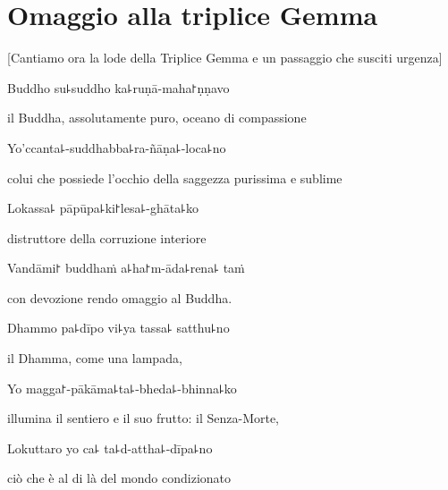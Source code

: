 \clearpage

\chapter{Omaggio alla triplice Gemma}

\begin{leader}
\end{leader}

\begin{english}
  [Cantiamo ora la lode della Triplice Gemma e un passaggio che susciti urgenza]
\end{english}

Buddho su꜕suddho ka꜕ruṇā-maha꜓ṇṇavo

\begin{english}
il Buddha, assolutamente puro, oceano di compassione
\end{english}

Yo'ccanta꜕-suddhabba꜕ra-ñāṇa꜕-loca꜕no

\begin{english}
colui che possiede l'occhio della saggezza purissima e sublime
\end{english}

Lokassa꜕ pāpūpa꜕ki꜓lesa꜕-ghāta꜕ko

\begin{english}
distruttore della corruzione interiore
\end{english}

Vandāmi꜓ buddhaṁ a꜕ha꜓m-āda꜕rena꜕ taṁ

\begin{english}
con devozione rendo omaggio al Buddha.
\end{english}

Dhammo pa꜕dīpo vi꜕ya tassa꜕ satthu꜕no

\begin{english}
il Dhamma, come una lampada,
\end{english}

Yo magga꜓-pākāma꜕ta꜕-bheda꜕-bhinna꜕ko

\begin{english}
illumina il sentiero e il suo frutto: il Senza-Morte,
\end{english}

Lokuttaro yo ca꜕ ta꜕d-attha꜕-dīpa꜕no

\begin{english}
ciò che è al di là del mondo condizionato
\end{english}

